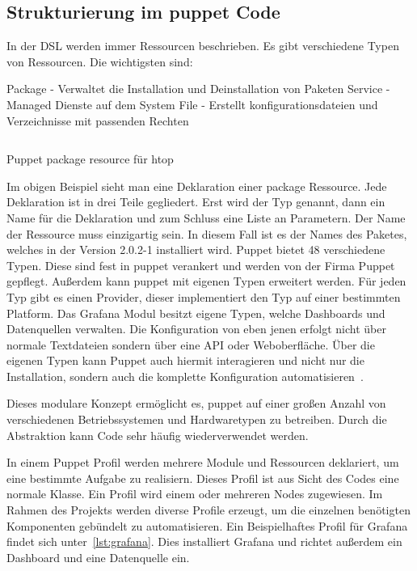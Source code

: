 \subsection{Strukturierung im puppet Code}
In der DSL werden immer Ressourcen beschrieben. Es gibt verschiedene Typen von
Ressourcen. Die wichtigsten sind:

\begin{outline}
  \1 Package - Verwaltet die Installation und Deinstallation von Paketen
  \1 Service - Managed Dienste auf dem System
  \1 File - Erstellt konfigurationsdateien und Verzeichnisse mit passenden
  Rechten
\end{outline}

\begin{listing}
  \inputminted{puppet}{../listings/basic-resource.txt}
  \caption{Puppet package resource für htop}
  \label{lst:puppet-resource}
\end{listing}

Im obigen Beispiel sieht man eine Deklaration einer package Ressource.  Jede
Deklaration ist in drei Teile gegliedert. Erst wird der Typ genannt, dann ein
Name für die Deklaration und zum Schluss eine Liste an Parametern. Der Name der
Ressource muss einzigartig sein. In diesem Fall ist es der Names des Paketes,
welches in der Version 2.0.2-1 installiert wird. Puppet bietet 48 verschiedene
Typen. Diese sind fest in puppet verankert und werden von der Firma Puppet
gepflegt. Außerdem kann puppet mit eigenen Typen erweitert werden. Für jeden
Typ gibt es einen Provider, dieser implementiert den Typ auf einer bestimmten
Platform. Das Grafana Modul besitzt eigene Typen, welche Dashboards und
Datenquellen verwalten. Die Konfiguration von eben jenen erfolgt nicht über
normale Textdateien sondern über eine API oder Weboberfläche. Über die eigenen
Typen kann Puppet auch hiermit interagieren und nicht nur die Installation,
sondern auch die komplette Konfiguration
automatisieren~\cite{puppet-resource-types}.

Dieses modulare Konzept ermöglicht es, puppet auf einer großen Anzahl von
verschiedenen Betriebssystemen und Hardwaretypen zu betreiben. Durch die
Abstraktion kann Code sehr häufig wiederverwendet werden.

In einem Puppet Profil werden mehrere Module und Ressourcen deklariert, um
eine bestimmte Aufgabe zu realisiern. Dieses Profil ist aus Sicht des Codes
eine normale Klasse. Ein Profil wird einem oder mehreren Nodes zugewiesen. Im
Rahmen des Projekts werden diverse Profile erzeugt, um die einzelnen benötigten
Komponenten gebündelt zu automatisieren. Ein Beispielhaftes Profil für Grafana
findet sich unter~\ref{lst:grafana}. Dies installiert Grafana und richtet
außerdem ein Dashboard und eine Datenquelle ein.
\tm%


